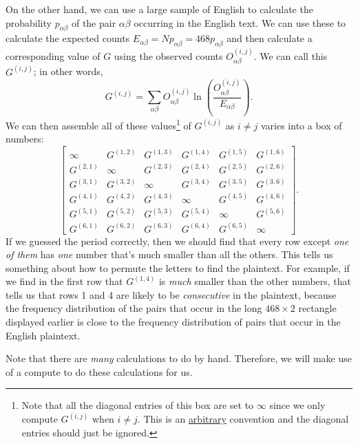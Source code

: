\documentclass[letterpaper]{article}
\newcommand{\0}{\mathbf{0}}
\begin{document}
\begin{enumerate}
    \bigskip 

    On the other hand, we can use a large sample of English to calculate the probability $p_{\alpha\beta}$ of the pair $\alpha\beta$ occurring in the English text. We can use these to calculate the expected counts $E_{\alpha\beta} = Np_{\alpha\beta} = 468p_{\alpha\beta}$ and then calculate a corresponding value of $G$ using the observed counts $O_{\alpha\beta}^{(i, j)}$. We can call this $G^{(i, j)}$; in other words, 
    \[G^{(i, j)} = \sum_{\alpha\beta} O_{\alpha\beta}^{(i, j)} \ln\left(\frac{O_{\alpha\beta}^{(i, j)}}{E_{\alpha\beta}}\right).\]
    We can then assemble all of these values\footnote{Note that all the diagonal entries of this box are set to $\infty$ since we only compute $G^{(i, j)}$ when $i \neq j$. This is an \underline{arbitrary} convention and the diagonal entries should just be ignored.} of $G^{(i, j)}$ as $i \neq j$ varies into a box of numbers: 
    \[\begin{bmatrix}
        \infty     & G^{(1, 2)} & G^{(1, 3)} & G^{(1, 4)} & G^{(1, 5)} & G^{(1, 6)} \\ 
        G^{(2, 1)} & \infty     & G^{(2, 3)} & G^{(2, 4)} & G^{(2, 5)} & G^{(2, 6)} \\ 
        G^{(3, 1)} & G^{(3, 2)} & \infty     & G^{(3, 4)} & G^{(3, 5)} & G^{(3, 6)} \\ 
        G^{(4, 1)} & G^{(4, 2)} & G^{(4, 3)} & \infty     & G^{(4, 5)} & G^{(4, 6)} \\ 
        G^{(5, 1)} & G^{(5, 2)} & G^{(5, 3)} & G^{(5, 4)} & \infty     & G^{(5, 6)} \\ 
        G^{(6, 1)} & G^{(6, 2)} & G^{(6, 3)} & G^{(6, 4)} & G^{(6, 5)} & \infty
    \end{bmatrix}.\]
    If we guessed the period correctly, then we should find that every row except \emph{one of them} has \emph{one} number that's much smaller than all the others. This tells us something about how to permute the letters to find the plaintext. For example, if we find in the first row that $G^{(1, 4)}$ is \emph{much} smaller than the other numbers, that tells us that rows 1 and 4 are likely to be \emph{consecutive} in the plaintext, because the frequency distribution of the pairs that occur in the long $468 \times 2$ rectangle displayed earlier is close to the frequency distribution of pairs that occur in the English plaintext.

    \bigskip 

    Note that there are \emph{many} calculations to do by hand. Therefore, we will make use of a compute to do these calculations for us. 
\end{enumerate}
\end{document}
